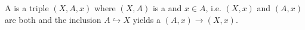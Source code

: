 \begin{definition} \label{definition:pointed_pair_of_topological_spaces}
    A  is a triple $(X,A,x)$ where $(X,A)$ is a  and $x \in A$, i.e. $(X,x)$ and $(A,x)$ are both  and the inclusion $A \hookrightarrow X$ yields a  $(A,x) \to (X,x)$.
\end{definition}